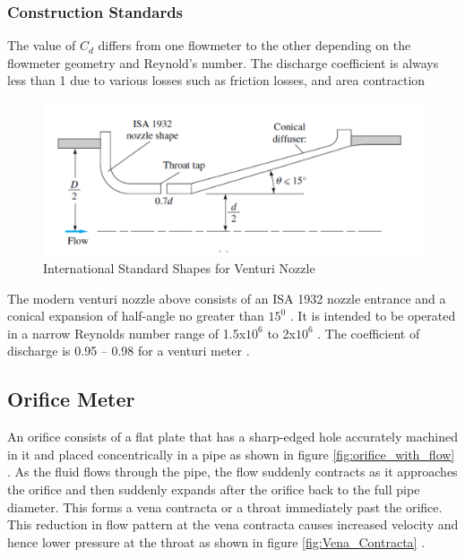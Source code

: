 \subsubsection{Construction Standards}
The value of $C_{d}$ differs from one flowmeter to the other depending on the flowmeter geometry and Reynold’s number. The discharge coefficient is always less than 1 due to various losses such as friction losses, and area contraction
\begin{figure}[ht]
\includegraphics[width=0.9\linewidth]{Figures/standard.png}
\centering
\caption{ International Standard Shapes for Venturi Nozzle }
\label{fig:International_Standard_Shapes_for_Venturi_Nozzle}
\end{figure}
The modern venturi nozzle above consists of an ISA 1932 nozzle entrance and a conical expansion of half-angle no greater than $15^0$ \cite{thorn201720}. It is intended to be operated in a narrow Reynolds number range of 1.5x$10^6$ to 2x$10^6$ \cite{salomo2019estimation}. The coefficient of discharge is 0.95 – 0.98 for a venturi meter \cite{stauffer2019multiple}.

\subsection{Orifice Meter}
An orifice consists of a flat plate that has a sharp-edged hole accurately machined in it and placed concentrically in a pipe as shown in figure \ref{fig:orifice_with_flow} \cite{pereira2009flow}. As the fluid flows through the pipe, the flow suddenly contracts as it approaches the orifice and then suddenly expands after the orifice back to the full pipe diameter. This forms a vena contracta or a throat immediately past the orifice. This reduction in flow pattern at the vena contracta causes increased velocity and hence lower pressure at the throat as shown in figure \ref{fig:Vena_Contracta} \cite{shah2012analysis}.

